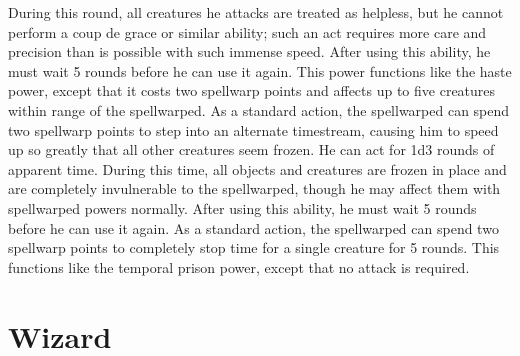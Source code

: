 During this round, all creatures he attacks are treated as helpless, but he cannot perform a coup de grace or similar ability; such an act requires more care and precision than is possible with such immense speed.
After using this ability, he must wait 5 rounds before he can use it again.
This power functions like the haste power, except that it costs two spellwarp points and affects up to five creatures within \rngclose range of the spellwarped.
As a standard action, the spellwarped can spend two spellwarp points to step into an alternate timestream, causing him to speed up so greatly that all other creatures seem frozen.
He can act for 1d3 rounds of apparent time.
During this time, all objects and creatures are frozen in place and are completely invulnerable to the spellwarped, though he may affect them with spellwarped powers normally.
After using this ability, he must wait 5 rounds before he can use it again.
As a standard action, the spellwarped can spend two spellwarp points to completely stop time for a single creature for 5 rounds.
This functions like the temporal prison power, except that no attack is required.
\norepeatnotes

\section{Wizard}

